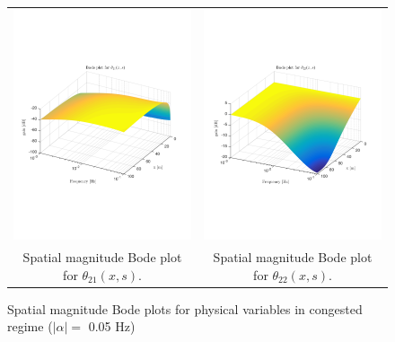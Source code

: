 \documentclass[preprint]{elsarticle}
\begin{document}
\begin{figure}
\begin{tabular}{cc}
\includegraphics[trim = 0mm 60mm 0mm 60mm, width = 8cm]{Bode_congested/distr_theta_21}
&
\includegraphics[trim = 0mm 60mm 0mm 60mm, width = 8cm]{Bode_congested/distr_theta_22}
\tabularnewline
Spatial magnitude Bode plot for $\theta_{21}(x,s)$.
&
Spatial magnitude Bode plot for $\theta_{22}(x,s)$.
\tabularnewline
\end{tabular}
\caption{Spatial magnitude Bode plots for physical variables in congested regime ($\left|\alpha\right| = $ 0.05 Hz)\label{fig:Magn_spatial_physx_congested}}
\end{figure}
\end{document}
